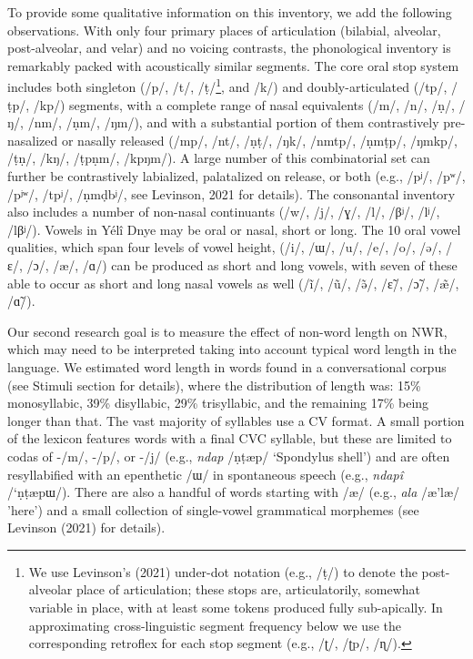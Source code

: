 \documentclass[
  american,
  ,man,floatsintext]{apa6}
\begin{document}
To provide some qualitative information on this inventory, we add the following observations. With only four primary places of articulation (bilabial, alveolar, post-alveolar, and velar) and no voicing contrasts, the phonological inventory is remarkably packed with acoustically similar segments. The core oral stop system includes both singleton (/p/, /t/, /ṭ/\footnote{We use Levinson's (2021) under-dot notation (e.g., /ṭ/) to denote the post-alveolar place of articulation; these stops are, articulatorily, somewhat variable in place, with at least some tokens produced fully sub-apically. In approximating cross-linguistic segment frequency below we use the corresponding retroflex for each stop segment (e.g., /ʈ/, /ʈp/, /ɳ/).}, and /k/) and doubly-articulated (/tp/, /ṭp/, /kp/) segments, with a complete range of nasal equivalents (/m/, /n/, /ṇ/, /ŋ/, /nm/, /ṇm/, /ŋm/), and with a substantial portion of them contrastively pre-nasalized or nasally released (/mp/, /nt/, /ṇṭ/, /ŋk/, /nmtp/, /ṇmṭp/, /ŋmkp/, /ṭṇ/, /kŋ/, /ṭpṇm/, /kpŋm/). A large number of this combinatorial set can further be contrastively labialized, palatalized on release, or both (e.g., /pʲ/, /pʷ/, /pʲʷ/, /tpʲ/, /ṇmḍbʲ/, see Levinson, 2021 for details). The consonantal inventory also includes a number of non-nasal continuants (/w/, /j/, /ɣ/, /l/, /βʲ/, /lʲ/, /lβʲ/). Vowels in Yélî Dnye may be oral or nasal, short or long. The 10 oral vowel qualities, which span four levels of vowel height, (/i/, /ɯ/, /u/, /e/, /o/, /ə/, /ɛ/, /ɔ/, /æ/, /ɑ/) can be produced as short and long vowels, with seven of these able to occur as short and long nasal vowels as well (/ĩ/, /ũ/, /ə̃/, /ɛ̃/, /ɔ̃/, /æ̃/, /ɑ̃/).

Our second research goal is to measure the effect of non-word length on NWR, which may need to be interpreted taking into account typical word length in the language.
We estimated word length in words found in a conversational corpus (see Stimuli section for details), where the distribution of length was: 15\% monosyllabic, 39\% disyllabic, 29\% trisyllabic, and the remaining 17\% being longer than that. The vast majority of syllables use a CV format. A small portion of the lexicon features words with a final CVC syllable, but these are limited to codas of -/m/, -/p/, or -/j/ (e.g., \emph{ndap} /ṇṭæp/ `Spondylus shell') and are often resyllabified with an epenthetic /ɯ/ in spontaneous speech (e.g., \emph{ndapî} /`ṇṭæpɯ/). There are also a handful of words starting with /æ/ (e.g., \emph{ala} /æ'læ/ 'here') and a small collection of single-vowel grammatical morphemes (see Levinson (2021) for details).
\end{document}
